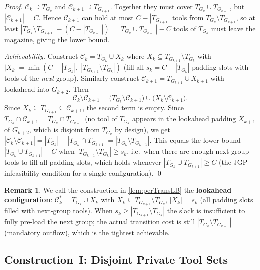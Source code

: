 \documentclass[11pt,a4paper]{article}
\theoremstyle{plain}
\theoremstyle{definition}
\newtheorem{remark}[theorem]{Remark}
\begin{document}
\begin{proof}
$\mathcal{C}_k \supseteq T_{G_k}$ and $\mathcal{C}_{k+1} \supseteq T_{G_{k+1}}$.
Together they must cover $T_{G_k} \cup T_{G_{k+1}}$, but $|\mathcal{C}_{k+1}| = C$.
Hence $\mathcal{C}_{k+1}$ can hold at most $C - |T_{G_{k+1}}|$ tools from
$T_{G_k} \setminus T_{G_{k+1}}$, so at least
$|T_{G_k} \setminus T_{G_{k+1}}| - (C - |T_{G_{k+1}}|)
= |T_{G_k} \cup T_{G_{k+1}}| - C$ tools of $T_{G_k}$ must leave the magazine,
giving the lower bound.

\medskip
\noindent\textit{Achievability.}
Construct $\mathcal{C}_k = T_{G_k} \cup X_k$ where
$X_k \subseteq T_{G_{k+1}} \setminus T_{G_k}$ with
$|X_k| = \min(C - |T_{G_k}|,\; |T_{G_{k+1}} \setminus T_{G_k}|)$
(fill all $s_k = C - |T_{G_k}|$ padding slots with tools of the \emph{next} group).
Similarly construct $\mathcal{C}_{k+1} = T_{G_{k+1}} \cup X_{k+1}$
with lookahead into $G_{k+2}$.
Then
\[
  \mathcal{C}_k \setminus \mathcal{C}_{k+1}
  = \bigl(T_{G_k} \setminus \mathcal{C}_{k+1}\bigr)
    \cup \bigl(X_k \setminus \mathcal{C}_{k+1}\bigr).
\]
Since $X_k \subseteq T_{G_{k+1}} \subseteq \mathcal{C}_{k+1}$, the second term is empty.
Since $T_{G_k} \cap \mathcal{C}_{k+1} = T_{G_k} \cap T_{G_{k+1}}$ (no tool of $T_{G_k}$
appears in the lookahead padding $X_{k+1}$ of $G_{k+2}$, which is disjoint from $T_{G_k}$
by design), we get
$|\mathcal{C}_k \setminus \mathcal{C}_{k+1}|
= |T_{G_k}| - |T_{G_k} \cap T_{G_{k+1}}|
= |T_{G_k} \setminus T_{G_{k+1}}|$.
This equals the lower bound $|T_{G_k} \cup T_{G_{k+1}}| - C$ when
$|T_{G_{k+1}} \setminus T_{G_k}| \ge s_k$, i.e.\ when there are enough next-group tools
to fill all padding slots, which holds whenever $|T_{G_k} \cup T_{G_{k+1}}| \ge C$ (the
JGP-infeasibility condition for a single configuration). \qed
\end{proof}

\begin{remark}
\label{rem:lookahead-name}
We call the construction in \cref{lem:perTransLB} the \textbf{lookahead configuration}:
$\mathcal{C}_k^* = T_{G_k} \cup X_k$ with $X_k \subseteq T_{G_{k+1}} \setminus T_{G_k}$,
$|X_k| = s_k$ (all padding slots filled with next-group tools).
When $s_k \ge |T_{G_{k+1}} \setminus T_{G_k}|$ the slack is insufficient to fully
pre-load the next group; the actual transition cost is still
$|T_{G_k} \setminus T_{G_{k+1}}|$ (mandatory outflow), which is the tightest achievable.
\end{remark}

\subsection{Construction~I: Disjoint Private Tool Sets}
\label{sec:constI}
\end{document}
